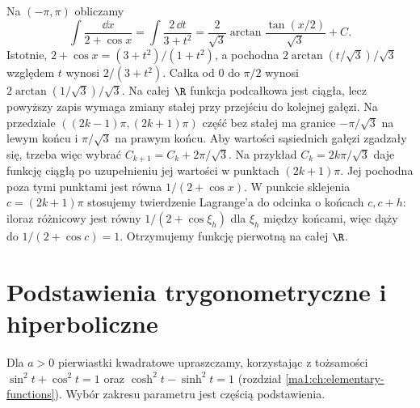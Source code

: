 \begin{przyklad}
\label{ma1:ex:weierstrass}
Na $(-\pi,\pi)$ obliczamy
\[
 \int\frac{\dd x}{2+\cos x}
 =\int\frac{2\,\dd t}{3+t^2}
 =\frac{2}{\sqrt3}\arctan\frac{\tan(x/2)}{\sqrt3}+C.
\]
Istotnie, $2+\cos x=(3+t^2)/(1+t^2)$, a pochodna $2\arctan(t/\sqrt3)/\sqrt3$ względem $t$ wynosi $2/(3+t^2)$. Całka od $0$ do $\pi/2$ wynosi $2\arctan(1/\sqrt3)/\sqrt3$. Na całej $\R$ funkcja podcałkowa jest ciągła, lecz powyższy zapis wymaga zmiany stałej przy przejściu do kolejnej gałęzi. Na przedziale $((2k-1)\pi,(2k+1)\pi)$ część bez stałej ma granice $-\pi/\sqrt3$ na lewym końcu i $\pi/\sqrt3$ na prawym końcu. Aby wartości sąsiednich gałęzi zgadzały się, trzeba więc wybrać $C_{k+1}=C_k+2\pi/\sqrt3$. Na przykład $C_k=2k\pi/\sqrt3$ daje funkcję ciągłą po uzupełnieniu jej wartości w punktach $(2k+1)\pi$. Jej pochodna poza tymi punktami jest równa $1/(2+\cos x)$. W punkcie sklejenia $c=(2k+1)\pi$ stosujemy twierdzenie Lagrange'a do odcinka o końcach $c,c+h$: iloraz różnicowy jest równy $1/(2+\cos \xi_h)$ dla $\xi_h$ między końcami, więc dąży do $1/(2+\cos c)=1$. Otrzymujemy funkcję pierwotną na całej $\R$.
\end{przyklad}

\section{Podstawienia trygonometryczne i hiperboliczne}
Dla $a>0$ pierwiastki kwadratowe upraszczamy, korzystając z tożsamości $\sin^2t+\cos^2t=1$ oraz $\cosh^2t-\sinh^2t=1$ (rozdział \ref{ma1:ch:elementary-functions}). Wybór zakresu parametru jest częścią podstawienia.

